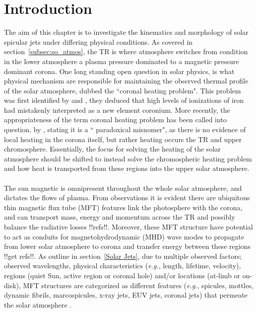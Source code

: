 \documentclass[12pt]{ociamthesis}
\newcommand{\np}{\\ \\}
\begin{document}
\section{Introduction}
\label{sec:c2intro}
The aim of this chapter is to investigate the kinematics and morphology of solar spicular jets under differing physical conditions. As covered in section~\ref{subsec:so_atmos}, the TR is where atmosphere switches from condition in the lower atmosphere a plasma pressure dominated to a magnetic pressure dominant corona. One long standing open question in solar physics, is what physical mechanism are responsible for maintaining the observed thermal profile of the solar atmosphere, dubbed the ``coronal heating problem". This problem was first identified by \cite{Grotrian1939} and \cite{Edl1943}, they deduced that high levels of ionizations of iron had mistakenly interpreted as a new element coronium. More recently, the appropriateness of the term coronal heating problem has been called into question, by \cite{Aschwanden2007ApJ}, stating it is a `` paradoxical misnomer", as there is no evidence of local heating in the corona itself, but rather heating occurs the TR and upper chromosphere. Essentially, the focus for solving the heating of the solar atmosphere should be shifted to instead solve the chromospheric heating problem and how heat is transported from these regions into the upper solar atmosphere. \np
%
The sun magnetic is omnipresent throughout the whole solar atmosphere, and dictates the flows of plasma. From observations it is evident there are ubiquitous thin magnetic flux tube (MFT) features link the photosphere with the corona, and can transport mass, energy and momentum across the TR and possibly balance the radiative losses !!refs!!. Moreover, these MFT structure have potential to act as conduits for magnetohydrodynamic (MHD) wave modes to propagate from lower solar atmosphere to corona and transfer energy between these regions !!get refs!!. As outline in section~\ref{Solar Jets}, due to multiple observed factors; observed wavelengths, physical characteristics (\textit{e.g.}, length, lifetime, velocity), regions (quiet Sun, active region or coronal hole) and/or locations (at-limb or on-disk), MFT structures are categorized as different features (\textit{e.g.}, spicules, mottles, dynamic fibrils, marcospicules, x-ray jets, EUV jets, coronal jets) that permeate the solar atmosphere \citep[see reviews by:][]{Beckers1968, Beckers1972ARA&A, Tsiropoula2012}. \np
%
\end{document}
